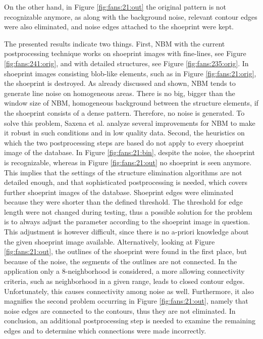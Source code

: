 \documentclass[draft,final]{vutinfth} %
\begin{document}
On the other hand, in Figure \ref{fig:fans:21:out} the original pattern is not recognizable anymore, as along with the background noise, relevant contour edges were also eliminated, and noise edges attached to the shoeprint were kept.
\par
The presented results indicate two things.
First, NBM with the current postprocessing technique works on shoeprint images with fine-lines, see Figure \ref{fig:fans:241:orig}, and with detailed structures, see Figure \ref{fig:fans:235:orig}.
In shoeprint images consisting blob-like elements, such as in Figure \ref{fig:fans:21:orig}, the shoeprint is destroyed.
As already discussed and shown, NBM tends to generate line noise on homogeneous areas.
There is no big, bigger than the window size of NBM, homogeneous background between the structure elements, if the shoeprint consists of a dense pattern.
Therefore, no noise is generated.
To solve this problem, Saxena et al. \cite{saxena2019niblack} analyze several improvements for NBM to make it robust in such conditions and in low quality data.
Second, the heuristics on which the two postprocessing steps are based do not apply to every shoeprint image of the database.
In Figure  \ref{fig:fans:21:bin}, despite the noise, the shoeprint is recognizable, whereas in Figure \ref{fig:fans:21:out} no shoeprint is seen anymore.
This implies that the settings of the structure elimination algorithms are not detailed enough, and that sophisticated postprocessing is needed, which covers further shoeprint images of the database.
Shoeprint edges were eliminated because they were shorter than the defined threshold.
The threshold for edge length were not changed during testing, thus a possible solution for the problem is to always adjust the parameter according to the shoeprint image in question.
This adjustment is however difficult, since there is no a-priori knowledge about the given shoeprint image available. 
Alternatively, looking at Figure  \ref{fig:fans:21:out}, the outlines of the shoeprint were found in the first place, but because of the noise, the segments of the outlines are not connected. 
In the application only a 8-neighborhood is considered, a more allowing connectivity criteria, such as neighborhood in a given range, leads to closed contour edges.
Unfortunately, this causes connectivity among noise as well.
Furthermore, it also magnifies the second problem occurring in Figure \ref{fig:fans:21:out}, namely that noise edges are connected to the contours, thus they are not eliminated.
In conclusion, an additional postprocessing step is needed to examine the remaining edges and to determine which connections were made incorrectly.
\end{document}
